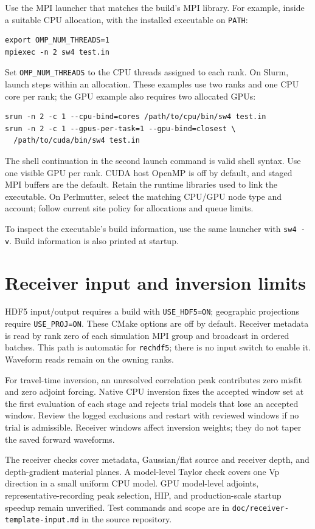 \documentclass[11pt]{report}
\begin{document}
Use the MPI launcher that matches the build's MPI library. For example,
inside a suitable CPU allocation, with the installed executable on \texttt{PATH}:
\begin{verbatim}
export OMP_NUM_THREADS=1
mpiexec -n 2 sw4 test.in
\end{verbatim}
Set \texttt{OMP\_NUM\_THREADS} to the CPU threads assigned to each rank.
On Slurm, launch steps within an allocation. These examples use two ranks
and one CPU core per rank; the GPU example also requires two allocated GPUs:
\begin{verbatim}
srun -n 2 -c 1 --cpu-bind=cores /path/to/cpu/bin/sw4 test.in
srun -n 2 -c 1 --gpus-per-task=1 --gpu-bind=closest \
  /path/to/cuda/bin/sw4 test.in
\end{verbatim}
The shell continuation in the second launch command is valid shell syntax.
Use one visible GPU per rank. CUDA host OpenMP is off by default, and staged
MPI buffers are the default. Retain the runtime libraries used to link the
executable. On Perlmutter, select the matching CPU/GPU node type and account;
follow current site policy for allocations and queue limits.

To inspect the executable's build information, use the same launcher with
\texttt{sw4 -v}. Build information is also printed at startup.

\section{Receiver input and inversion limits}
HDF5 input/output requires a build with \texttt{USE\_HDF5=ON}; geographic
projections require \texttt{USE\_PROJ=ON}. These CMake options are off by
default. Receiver metadata is read by rank zero of each simulation
MPI group and broadcast in ordered batches. This path is automatic for
\texttt{rechdf5}; there is no input switch to enable it.
Waveform reads remain on the owning ranks.

For travel-time inversion, an unresolved correlation peak contributes zero
misfit and zero adjoint forcing. Native CPU inversion fixes the accepted
window set at the first evaluation of each stage and rejects trial models
that lose an accepted window. Review the logged exclusions and restart with
reviewed windows if no trial is admissible. Receiver windows affect inversion
weights; they do not taper the saved forward waveforms.

The receiver checks cover metadata, Gaussian/flat source and receiver depth,
and depth-gradient material planes. A model-level Taylor check covers one
Vp direction in a small uniform CPU model. GPU model-level adjoints,
representative-recording peak selection, HIP, and production-scale startup
speedup remain unverified. Test commands and scope are in
\texttt{doc/receiver-template-input.md} in the source repository.
\end{document}
